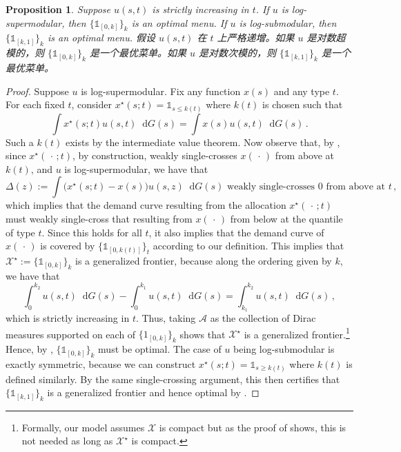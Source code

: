 \documentclass[12pt,letterpaper]{article}
\newenvironment{original}{\color{black}\noindent}{}
\newenvironment{translation}{\color{blue}\noindent}{}
\theoremstyle{plain}
\newtheorem{prop}{Proposition}
\theoremstyle{definition}
\theoremstyle{remark}
\renewcommand{\1}{\mathds{1}}
\renewcommand*\d{\mathop{}\!\mathrm{d}}
\newcommand{\X}{\mathcal{X}}
\theoremstyle{definition}
\begin{document}
\begin{prop}\label{prop:function}
\begin{original}
Suppose $u(s, t)$ is strictly increasing in $t$. If $u$ is log-supermodular, then $\{\1_{[0, k]}\}_k$ is an optimal menu. If $u$ is log-submodular, then $\{\1_{[k,1]}\}_k$ is an optimal menu.
\end{original}
\begin{translation}
假设 $u(s, t)$ 在 $t$ 上严格递增。如果 $u$ 是对数超模的，则 $\{\1_{[0, k]}\}_k$ 是一个最优菜单。如果 $u$ 是对数次模的，则 $\{\1_{[k,1]}\}_k$ 是一个最优菜单。
\end{translation}
\end{prop}
\begin{proof}
\begin{original}
Suppose $u$ is log-supermodular. Fix any function $x(s)$ and any type $t$. For each fixed $t$, consider $x^\star(s; t) = \1_{s \leq k(t)}$ where $k(t)$ is chosen such that
\[\int x^\star(s; t) u(s, t) \d G(s)= \int x(s) u(s, t) \d G(s) \,.\]
Such a $k(t)$ exists by the intermediate value theorem. Now observe that, by \citet{karlin1956theory}, since $x^\star(\,\cdot\,; t)$, by construction, weakly single-crosses $x(\,\cdot\,)$ from above at $k(t)$, and $u$ is log-supermodular, we have that
\[\Delta(z):= \int \big(x^\star(s; t) - x(s)\big) u(s, z) \d G(s) \text{ weakly single-crosses $0$ from above at $t$}\,, \]
which implies that the demand curve resulting from the allocation $x^\star(\,\cdot\,; t)$ must weakly single-cross that resulting from $x(\,\cdot\,)$ from below at the quantile of type $t$. Since this holds for all $t$, it also implies that the demand curve of $x(\,\cdot\,)$ is covered by $ \{\1_{[0, k(t)]}\}_{t}$ according to our definition. This implies that $\X^\star:=  \{\1_{[0, k]}\}_{k}$ is a generalized frontier, because along the ordering given by $k$, we have that
\[\int^{k_2}_0 u(s, t) \d G(s) - \int^{k_1}_0 u(s, t) \d G(s)  = \int_{k_1}^{k_2} u(s, t) \d G(s)\,,\]
which is strictly increasing in $t$. Thus, taking $\mathcal{A}$ as the collection of Dirac measures supported on each of $\{1_{[0, k]}\}_{k}$ shows that $\X^\star$ is a generalized frontier.\footnote{Formally, our model assumes $\X$ is compact but as the proof of  shows, this is not needed as long as $\X^\star$ is compact.} Hence, by , $\{\1_{[0, k]}\}_{k}$ must be optimal. The case of $u$ being log-submodular is exactly symmetric, because we can construct $x^\star(s; t) = \1_{s \geq k(t)}$ where $k(t)$ is defined similarly. By the same single-crossing argument, this then certifies that $\{\1_{[k, 1]}\}_k$ is a generalized frontier and hence optimal by .

\end{original}
\end{proof}
\end{document}
